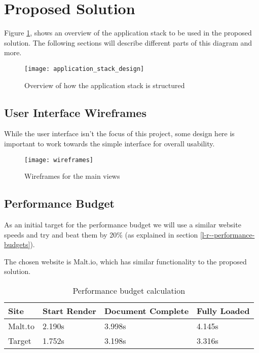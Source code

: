 \section{Proposed Solution} \label{a-d--proposed-solution}

Figure \ref{figure-application-stack-design}, shows an overview of the application stack to be used in the proposed solution. The following sections will describe different parts of this diagram and more.

\begin{figure}[H]
  \centering
    \texttt{[image: application\_stack\_design]}
  \caption{Overview of how the application stack is structured}
  \label{figure-application-stack-design}
\end{figure}

\subsection{User Interface Wireframes}

While the user interface isn't the focus of this project, some design here is important to work towards the simple interface for overall usability.

\begin{figure}[H]
  \centering
    \texttt{[image: wireframes]}
  \caption{Wireframes for the main views}
  \label{figure-wireframes}
\end{figure}

\subsection{Performance Budget}

As an initial target for the performance budget we will use a similar website speeds and try and beat them by 20\% (as explained in section \ref{l-r--performance-budgets}).

The chosen website is Malt.io, which has similar functionality to the proposed solution.

\begin{table}[H]
\centering
\begin{tabular}{|l|l|l|l|}
\hline
\textbf{Site}     & \textbf{Start Render} & \textbf{Document Complete} & \textbf{Fully Loaded} \\ \hline
Malt.to           & 2.190s                & 3.998s                     & 4.145s                \\ \hline
Target            & 1.752s                & 3.198s                     & 3.316s                \\ \hline
\end{tabular}
\caption{Performance budget calculation}
\label{table-performance-budget}
\end{table}

